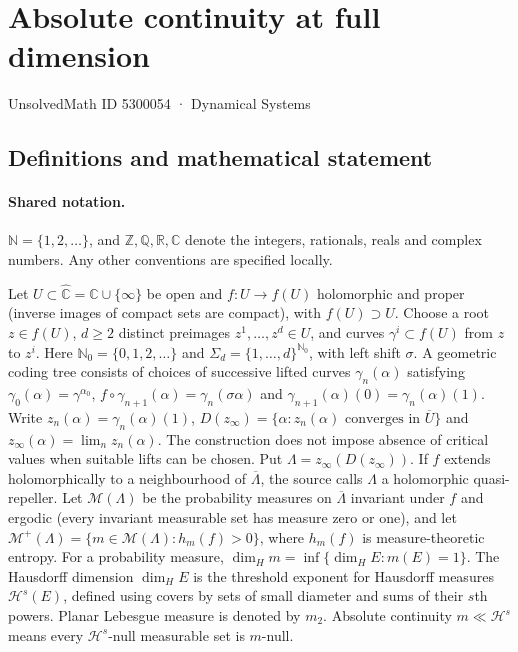 \documentclass[11pt]{article}
\begin{document}
\setcounter{section}{5300053}
\section{Absolute continuity at full dimension}\label{5300054}
{\small\sffamily UnsolvedMath ID 5300054 · Dynamical Systems}
\subsection{Definitions and mathematical statement}

\paragraph{Shared notation.}$\mathbb N=\{1,2,\ldots\}$, and $\mathbb Z,\mathbb Q,\mathbb R,\mathbb C$ denote the integers, rationals, reals and complex numbers. Any other conventions are specified locally.


Let $U\subset\widehat{\mathbb C}=\mathbb C\cup\{\infty\}$ be open and $f:U\to f(U)$ holomorphic and proper (inverse images of compact sets are compact), with $f(U)\supset U$. Choose a root $z\in f(U)$, $d\geq2$ distinct preimages $z^1,\ldots,z^d\in U$, and curves $\gamma^i\subset f(U)$ from $z$ to $z^i$. Here $\mathbb N_0=\{0,1,2,\ldots\}$ and $\Sigma_d=\{1,\ldots,d\}^{\mathbb N_0}$, with left shift $\sigma$. A geometric coding tree consists of choices of successive lifted curves $\gamma_n(\alpha)$ satisfying $\gamma_0(\alpha)=\gamma^{\alpha_0}$, $f\circ\gamma_{n+1}(\alpha)=\gamma_n(\sigma\alpha)$ and $\gamma_{n+1}(\alpha)(0)=\gamma_n(\alpha)(1)$. Write $z_n(\alpha)=\gamma_n(\alpha)(1)$, $D(z_\infty)=\{\alpha:z_n(\alpha)\text{ converges in }\overline U\}$ and $z_\infty(\alpha)=\lim_n z_n(\alpha)$. The construction does not impose absence of critical values when suitable lifts can be chosen. Put $\Lambda=z_\infty(D(z_\infty))$. If $f$ extends holomorphically to a neighbourhood of $\overline\Lambda$, the source calls $\Lambda$ a holomorphic quasi-repeller. Let $\mathcal M(\Lambda)$ be the probability measures on $\overline\Lambda$ invariant under $f$ and ergodic (every invariant measurable set has measure zero or one), and let $\mathcal M^+(\Lambda)=\{m\in\mathcal M(\Lambda):h_m(f)>0\}$, where $h_m(f)$ is measure-theoretic entropy. For a probability measure, $\dim_Hm=\inf\{\dim_HE:m(E)=1\}$. The Hausdorff dimension $\dim_H E$ is the threshold exponent for Hausdorff measures $\mathcal H^s(E)$, defined using covers by sets of small diameter and sums of their $s$th powers. Planar Lebesgue measure is denoted by $m_2$. Absolute continuity $m\ll\mathcal H^s$ means every $\mathcal H^s$-null measurable set is $m$-null.
\end{document}

